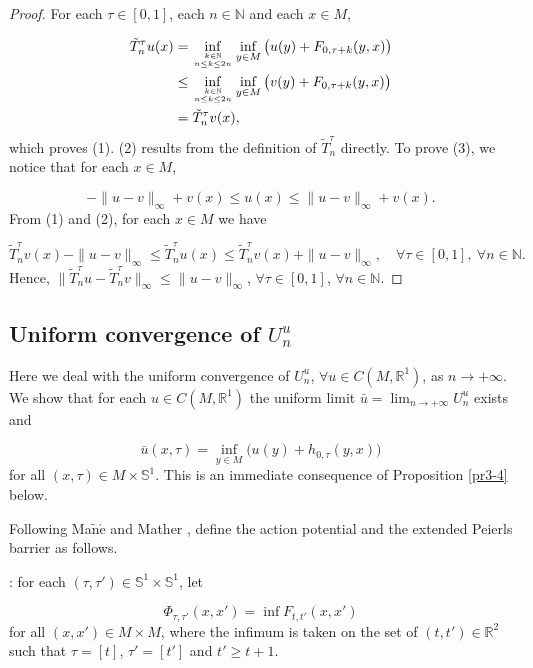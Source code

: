 \documentclass{amsart}[12pt]
\theoremstyle{definition}
\theoremstyle{remark}
\numberwithin{equation}{section}
\begin{document}
\begin{proof}
For each $\tau\in[0,1]$, each $n\in\mathbb{N}$ and each $x\in M$,

\begin{align*}
\tilde{T}_n^\tau u(x) & =\inf_{k\in\mathbb{N} \atop n\leq k\leq
                       2n}\inf_{y\in
                       M}\big(u(y)+F_{0,\tau+k}(y,x)\big)\\
                      & \leq \inf_{k\in\mathbb{N} \atop n\leq k\leq
                       2n}\inf_{y\in
                       M}\big(v(y)+F_{0,\tau+k}(y,x)\big)\\
                      &= \tilde{T}_n^\tau v(x),
\end{align*}
which proves (1). (2) results from the definition of
$\tilde{T}_n^\tau$ directly. To prove (3), we notice that for each
$x\in M$,

\[
-\|u-v\|_\infty+v(x)\leq u(x)\leq\|u-v\|_\infty+v(x).
\]
From (1) and (2), for each $x\in M$ we have

\[
\tilde{T}_n^\tau v(x)-\|u-v\|_\infty\leq \tilde{T}_n^\tau u(x)\leq
\tilde{T}_n^\tau v(x)+\|u-v\|_\infty, \quad \forall \tau\in[0,1],
\ \forall n\in\mathbb{N}.
\]
Hence, $\|\tilde{T}_n^\tau u-\tilde{T}_n^\tau
v\|_\infty\leq\|u-v\|_\infty$, $\forall \tau\in[0,1]$, $\forall
n\in\mathbb{N}$.
\end{proof}

\subsection{Uniform convergence of $U^u_n$}
Here we deal with the uniform convergence of $U^u_n$, $\forall
u\in C(M,\mathbb{R}^1)$, as $n\to+\infty$. We show that for each
$u\in C(M,\mathbb{R}^1)$ the uniform limit
$\bar{u}=\lim_{n\to+\infty}U^u_n$ exists and

\[
\bar{u}(x,\tau)=\inf_{y\in M}\big(u(y)+h_{0,\tau}(y,x)\big)
\]
for all $(x,\tau)\in M\times\mathbb{S}^1$. This is an immediate
consequence of Proposition \ref{pr3-4} below.

Following Ma$\mathrm{\tilde{n}}\mathrm{\acute{e}}$ \cite{Man97}
and Mather \cite{Mat93}, define the action potential and the
extended Peierls barrier as follows.

\vskip0.1cm

: for each
$(\tau,\tau')\in\mathbb{S}^1\times\mathbb{S}^1$, let

\[
\Phi_{\tau,\tau'}(x,x')=\inf F_{t,t'}(x,x')
\]
for all $(x,x')\in M\times M$, where the infimum is taken on the
set of $(t,t')\in\mathbb{R}^2$ such that $\tau=[t]$, $\tau'=[t']$
and $t'\geq t+1$.
\end{document}
